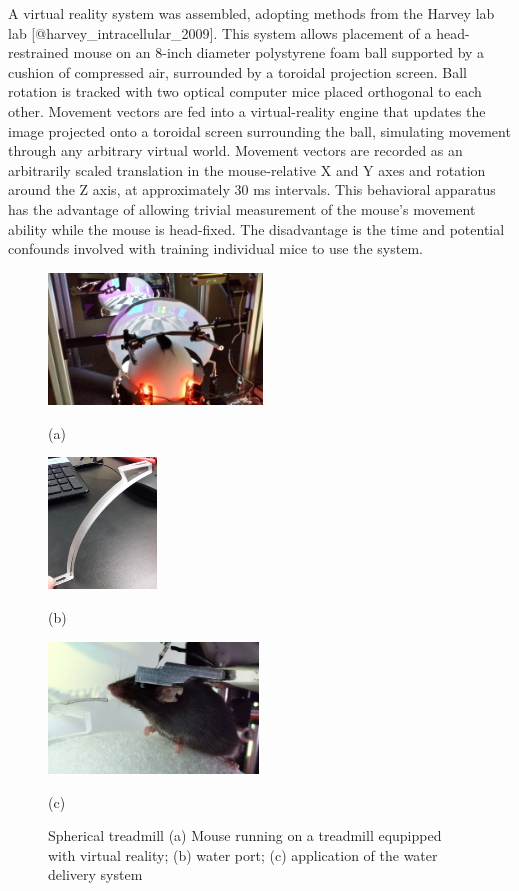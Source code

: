 A virtual reality system was assembled, adopting methods from the Harvey
lab lab {[}@harvey\_intracellular\_2009{]}. This system allows placement
of a head-restrained mouse on an 8-inch diameter polystyrene foam ball
supported by a cushion of compressed air, surrounded by a toroidal
projection screen. Ball rotation is tracked with two optical computer
mice placed orthogonal to each other. Movement vectors are fed into a
virtual-reality engine that updates the image projected onto a toroidal
screen surrounding the ball, simulating movement through any arbitrary
virtual world. Movement vectors are recorded as an arbitrarily scaled
translation in the mouse-relative X and Y axes and rotation around the Z
axis, at approximately 30 ms intervals. This behavioral apparatus has
the advantage of allowing trivial measurement of the mouse's movement
ability while the mouse is head-fixed. The disadvantage is the time and
potential confounds involved with training individual mice to use the
system.



\begin{figure}[htb]
  \begin{minipage}[t]{0.32\linewidth}\centering
    \includegraphics[height=3.5cm]{01-treadmill-mouse-running.jpg}
    \centerline{(a)}
  \end{minipage}\hfill
  \begin{minipage}[t]{0.15\linewidth}\centering
    \includegraphics[height=3.5cm]{01-water-port.jpg}
        \centerline{(b)}
  \end{minipage}
  \begin{minipage}[t]{0.45\linewidth}\centering
    \includegraphics[height=3.5cm]{03-water-delivery-zoom.jpg}
    \centerline{(c)}
  \end{minipage}
  \caption{Spherical treadmill (a) Mouse running on a treadmill equpipped with virtual reality; (b) water port; (c) application of the water delivery system }
  \label{fig:Spherical treadmill}
\end{figure}



